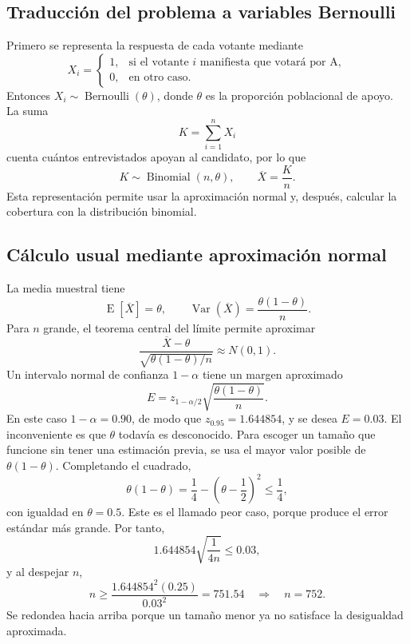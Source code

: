 \documentclass[10pt,a4paper,oneside]{article}
\newcommand{\E}{\operatorname{E}}
\newcommand{\Var}{\operatorname{Var}}
\begin{document}
\subsection*{Traducción del problema a variables Bernoulli}

Primero se representa la respuesta de cada votante mediante
\begin{equation*}
X_i=
\begin{cases}
1, & \text{si el votante $i$ manifiesta que votará por A},\\
0, & \text{en otro caso}.
\end{cases}
\end{equation*}
Entonces $X_i\sim\operatorname{Bernoulli}(\theta)$, donde $\theta$ es la proporción poblacional de apoyo. La suma
\begin{equation*}
K=\sum_{i=1}^{n}X_i
\end{equation*}
cuenta cuántos entrevistados apoyan al candidato, por lo que
\begin{equation*}
K\sim\operatorname{Binomial}(n,\theta),
\qquad
\overline X=\frac{K}{n}.
\end{equation*}
Esta representación permite usar la aproximación normal y, después, calcular la cobertura con la distribución binomial.

\subsection*{Cálculo usual mediante aproximación normal}

La media muestral tiene
\begin{equation*}
\E[\overline X]=\theta,
\qquad
\Var(\overline X)=\frac{\theta(1-\theta)}{n}.
\end{equation*}
Para $n$ grande, el teorema central del límite permite aproximar
\begin{equation*}
\frac{\overline X-\theta}{\sqrt{\theta(1-\theta)/n}}\approx N(0,1).
\end{equation*}
Un intervalo normal de confianza $1-\alpha$ tiene un margen aproximado
\begin{equation*}
E=z_{1-\alpha/2}\sqrt{\frac{\theta(1-\theta)}{n}}.
\end{equation*}
En este caso $1-\alpha=0.90$, de modo que $z_{0.95}=1.644854$, y se desea $E=0.03$. El inconveniente es que $\theta$ todavía es desconocido. Para escoger un tamaño que funcione sin tener una estimación previa, se usa el mayor valor posible de $\theta(1-\theta)$. Completando el cuadrado,
\begin{equation*}
\theta(1-\theta)=\frac14-\left(\theta-\frac12\right)^2\leq\frac14,
\end{equation*}
con igualdad en $\theta=0.5$. Este es el llamado peor caso, porque produce el error estándar más grande. Por tanto,
\begin{equation*}
1.644854\sqrt{\frac{1}{4n}}\leq0.03,
\end{equation*}
y al despejar $n$,
\begin{equation}
\boxed{
 n\geq\frac{1.644854^2(0.25)}{0.03^2}=751.54
 \quad\Longrightarrow\quad n=752.}
\label{eq:n-prop}
\end{equation}
Se redondea hacia arriba porque un tamaño menor ya no satisface la desigualdad aproximada.
\end{document}
